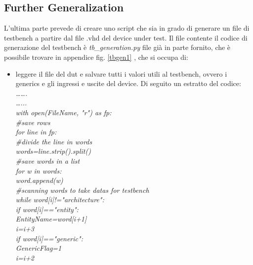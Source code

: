 \subsection{Further Generalization}
L’ultima parte prevede di creare uno script che sia in grado di generare un file di testbench a partire dal file .vhd del device under test. Il file contente il codice di generazione del testbench è \textit{tb\_generation.py} file già in parte fornito, che è possibile trovare in appendice fig. \ref{tbgen1} , che si occupa di:
\begin{itemize}
	\item{leggere il file del dut e salvare tutti i valori utili al testbench, ovvero i generics e gli ingressi e uscite del device. Di seguito un estratto del codice:\\
	\textit{…….\\
	…...\\    
	with open(FileName, "r") as fp:\\
	\hspace*{1cm}\#save rows\\
	\hspace*{1cm}for line in fp:\\
	\hspace*{2cm}\#divide the line in words\\
	\hspace*{2cm}words=line.strip().split()\\
	\hspace*{2cm}\#save words in a list\\
	\hspace*{2cm}for w in words:\\
	\hspace*{3cm}word.append(w)\\
	\#scanning words to take datas for testbench\\
	while word[i]!="architecture":\\
	\hspace*{1cm}if word[i]=="entity":\\
	\hspace*{2cm}EntityName=word[i+1]\\
	\hspace*{2cm}i=i+3\\
	\hspace*{1cm}if word[i]=="generic":\\
	\hspace*{2cm}GenericFlag=1\\
	\hspace*{2cm}i=i+2\\
}}
\end{itemize}
